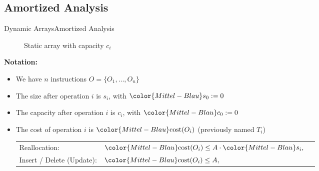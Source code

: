 
\subsection{Amortized Analysis}

\begin{frame}{Dynamic Arrays}{Amortized Analysis}
  \vspace*{-1.0em}
  \begin{figure}[!t]%
    \def\FSAsize{16}\def\FSAelements{11}%
    \def\FSAcopy{0}\def\FSAdelete{0}\def\FSAinsert{0}%
    \def \FSAcopyarrow{1}%
    \def\FSAlabelsize{Size ${\color{Mittel-Blau}s_i}$}%
    \def\FSAlabelcapacity{Capacity ${\color{Mittel-Blau}c_i}$}%
    \vspace*{-0.5em}%
    \caption{Static array with capacity $c_i$}%
    \label{fig:array_amortized analysis}%
  \end{figure}%
  \vspace*{-1.0em}
  \textbf{Notation:}%
  \begin{itemize}%
    \item
      We have $n$ instructions $O = \{O_1,\dots,O_n\}$
    \item
      The {\color{Mittel-Blau}size} after operation $i$ is
      {\color{Mittel-Blau}$s_i$},
      with ${\color{Mittel-Blau}s_0} := 0$
    \item
      The {\color{Mittel-Blau}capacity} after operation $i$ is
      {\color{Mittel-Blau}$c_i$},
      with ${\color{Mittel-Blau}c_0} := 0$
    \item
      The {\color{Mittel-Blau}cost} of operation $i$ is
      ${\color{Mittel-Blau}\mathrm{cost}(O_i)}$
      (previously named $T_i$)\\[0.5em]
      \begin{tabular}{lll}
        Reallocation: &
        ${\color{Mittel-Blau}\mathrm{cost}(O_i)}
          \leq A \cdot {\color{Mittel-Blau}s_i},$ & {}\\
        Insert / Delete (Update): &
        ${\color{Mittel-Blau}\mathrm{cost}(O_i)}
          \leq A,$ & {}
      \end{tabular}
  \end{itemize}
\end{frame}

